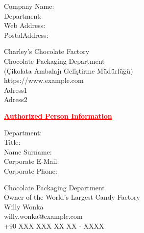 \documentclass[12pt]{article}
\begin{document}
\begin{minipage}[t]{.20\textwidth}
  \begin{flushright}
      Company Name: \\
      Department: \\
      Web Address: \\
      PostalAddress:
  \end{flushright}
\end{minipage}%
\hspace{0.5cm}
\begin{minipage}[t]{.80\textwidth}
Charley's Chocolate Factory \\
Chocolate Packaging Department \\ 
(Çikolata Ambalajı Geliştirme Müdürlüğü) \\
https://www.example.com\\
Adress1 \\ Adress2\\
\end{minipage}

\newpage
    {\centering
  \textcolor{red}{\bfseries \ul{Authorized Person Information}}
  \\[1\baselineskip]
  \par}

\begin{minipage}[t]{.25\textwidth}
  \begin{flushright}
      Department: \\
      Title: \\
      Name Surname: \\
      Corporate E-Mail: \\
      Corporate Phone:
  \end{flushright}
\end{minipage}%
\hspace{0.5cm}
\begin{minipage}[t]{.75\textwidth}
  Chocolate Packaging Department \\
  Owner of the World's Largest Candy Factory  \\
  Willy Wonka \\
  willy.wonka@example.com \\
  +90 XXX XXX XX XX - XXXX \\[2\baselineskip]
\end{minipage}
\end{document}
